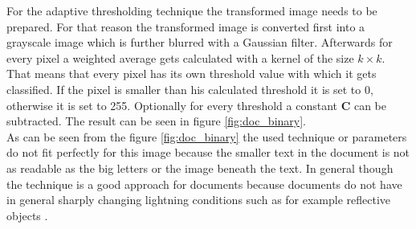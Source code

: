 For the adaptive thresholding technique the transformed image needs to be prepared. For that reason the transformed image is converted first into a grayscale image which is further blurred with a Gaussian filter. Afterwards for every pixel a weighted average gets calculated with a kernel of the size $k\times k$. That means that every pixel has its own threshold value with which it gets classified. If the pixel is smaller than his calculated threshold it is set to 0, otherwise it is set to 255. Optionally for every threshold a constant \textbf{C} can be subtracted. \cite{oreily} \cite{threshold} The result can be seen in figure \ref{fig:doc_binary}.\\

As can be seen from the figure \ref{fig:doc_binary} the used technique or parameters do not fit perfectly for this image because the smaller text in the document is not as readable as the big letters or the image beneath the text. In general though the technique is a good approach for documents because documents do not have in general sharply changing lightning conditions such as for example reflective objects .